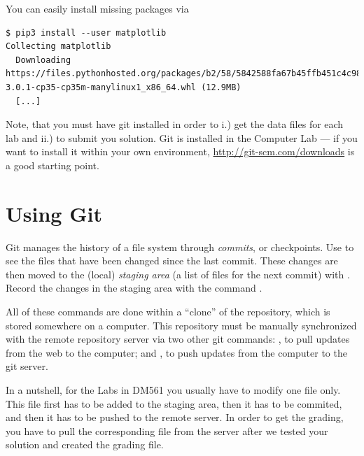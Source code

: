\begin{enumerate}
You can easily install missing packages via

\begin{lstlisting}
$ pip3 install --user matplotlib
Collecting matplotlib
  Downloading https://files.pythonhosted.org/packages/b2/58/5842588fa67b45ffb451c4c98eda283c0c42b8f2c5e503e4f6d9ff3c3a63/matplotlib-3.0.1-cp35-cp35m-manylinux1_x86_64.whl (12.9MB)
  [...]
  \end{lstlisting}

\end{enumerate}


Note, that you must have git installed in order to i.) get the data files for each lab and ii.) to submit you solution. Git is installed in the Computer Lab --- if you want to install it within your own environment, \url{http://git-scm.com/downloads} is a good starting point.

\section*{Using Git} %

Git manages the history of a file system through \emph{commits}, or checkpoints.
Use  to see the files that have been changed since the last commit.
These changes are then moved to the (local) \emph{staging area} (a list of files for the next commit) with .
Record the changes in the staging area with the command .

All of these commands are done within a ``clone'' of the repository, which is stored somewhere on a computer.
This repository must be manually synchronized with the remote repository server via two other git commands: , to pull updates from the web to the computer; and , to push updates from the computer to the git server.

In a nutshell, for the Labs in DM561 you usually have to modify one file only. This file first has to be added to the staging area, then it has to be commited, and then it has to be pushed to the remote server. In order to get the grading, you have to pull the corresponding file from the server after we tested your solution and created the grading file.

